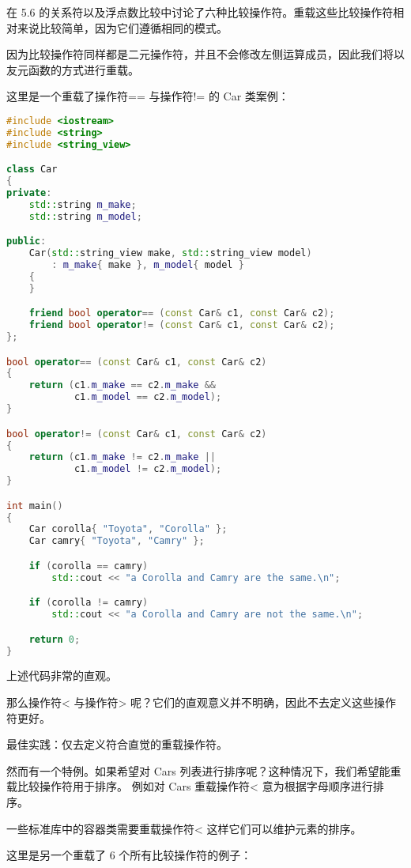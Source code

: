 \documentclass[../../LearnCpp.tex]{subfiles}
\begin{document}

在 5.6 的关系符以及浮点数比较中讨论了六种比较操作符。重载这些比较操作符相对来说比较简单，因为它们遵循相同的模式。

因为比较操作符同样都是二元操作符，并且不会修改左侧运算成员，因此我们将以友元函数的方式进行重载。

这里是一个重载了操作符== 与操作符!= 的 Car 类案例：

\begin{lstlisting}[language=C++]
#include <iostream>
#include <string>
#include <string_view>

class Car
{
private:
    std::string m_make;
    std::string m_model;

public:
    Car(std::string_view make, std::string_view model)
        : m_make{ make }, m_model{ model }
    {
    }

    friend bool operator== (const Car& c1, const Car& c2);
    friend bool operator!= (const Car& c1, const Car& c2);
};

bool operator== (const Car& c1, const Car& c2)
{
    return (c1.m_make == c2.m_make &&
            c1.m_model == c2.m_model);
}

bool operator!= (const Car& c1, const Car& c2)
{
    return (c1.m_make != c2.m_make ||
            c1.m_model != c2.m_model);
}

int main()
{
    Car corolla{ "Toyota", "Corolla" };
    Car camry{ "Toyota", "Camry" };

    if (corolla == camry)
        std::cout << "a Corolla and Camry are the same.\n";

    if (corolla != camry)
        std::cout << "a Corolla and Camry are not the same.\n";

    return 0;
}
\end{lstlisting}

上述代码非常的直观。

那么操作符< 与操作符> 呢？它们的直观意义并不明确，因此不去定义这些操作符更好。

最佳实践：仅去定义符合直觉的重载操作符。

然而有一个特例。如果希望对 Cars 列表进行排序呢？这种情况下，我们希望能重载比较操作符用于排序。
例如对 Cars 重载操作符< 意为根据字母顺序进行排序。

一些标准库中的容器类需要重载操作符< 这样它们可以维护元素的排序。

这里是另一个重载了 6 个所有比较操作符的例子：
\end{document}
